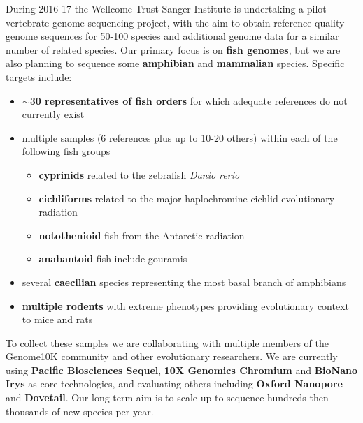 \documentclass[a0,portrait]{a0poster}
\begin{document}
\begin{multicols}{2}
During 2016-17 the Wellcome Trust Sanger Institute is undertaking a pilot vertebrate genome sequencing project, with the aim to obtain reference quality genome sequences for 50-100 species and additional genome data for a similar number of related species. Our primary focus is on \textbf{fish genomes}, but we are also planning to sequence some \textbf{amphibian} and \textbf{mammalian} species. Specific targets include:
\vspace{0.5cm}
\begin{tcolorbox}[boxsep=30pt,width=0.48\textwidth,colback=sangerlightteal,arc=20pt]
\large \color{sangertext}
\begin{flushleft}
\begin{itemize}
\setlength{\itemsep}{1.5pt}
\item \textbf{$\sim$30 representatives of fish orders} for which adequate references do not currently exist
\item multiple samples (6 references plus up to 10-20 others) within each of the following fish groups
\begin{itemize}
	\item \textbf{cyprinids} related to the zebrafish \emph{Danio rerio}
	\item \textbf{cichliforms} related to the major haplochromine cichlid evolutionary radiation
	\item \textbf{notothenioid} fish from the Antarctic radiation
	\item \textbf{anabantoid} fish include gouramis
\end{itemize}
\item several \textbf{caecilian} species representing the most basal branch of amphibians
\item \textbf{multiple rodents} with extreme phenotypes providing evolutionary context to mice and rats
\end{itemize}
\end{flushleft}
\end{tcolorbox}
\vspace{0.5cm}
\noindent To collect these samples we are collaborating with multiple members of the Genome10K community and other evolutionary researchers. We are currently using \textbf{Pacific Biosciences Sequel}, \textbf{10X Genomics Chromium} and \textbf{BioNano Irys} as core technologies, and evaluating others including \textbf{Oxford Nanopore} and \textbf{Dovetail}. Our long term aim is to scale up to sequence hundreds then thousands of new species per year.

\vfill
\columnbreak


\end{multicols}
\end{document}
